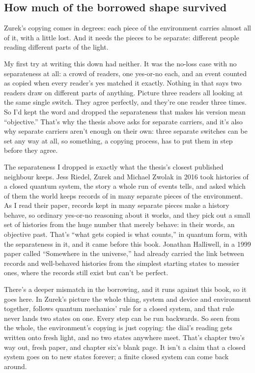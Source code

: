 \documentclass[11pt,twoside]{article}
\theoremstyle{thielethm}
\theoremstyle{thieledef}
\theoremstyle{thieledef}
\theoremstyle{thieledef}
\theoremstyle{thielethm}
\theoremstyle{thieleobs}
\theoremstyle{thielethm}
\begin{document}
\subsection{How much of the borrowed shape survived}

Zurek's copying comes in degrees: each piece of the environment carries almost all of it, with a little lost. And it needs the pieces to be separate: different people reading different parts of the light.

My first try at writing this down had neither. It was the no-loss case with no separateness at all: a crowd of readers, one yes-or-no each, and an event counted as copied when every reader's yes matched it exactly. Nothing in that says two readers draw on different parts of anything. Picture three readers all looking at the same single switch. They agree perfectly, and they're one reader three times. So I'd kept the word and dropped the separateness that makes his version mean ``objective.'' That's why the thesis above asks for separate carriers, and it's also why separate carriers aren't enough on their own: three separate switches can be set any way at all, so something, a copying process, has to put them in step before they agree.

The separateness I dropped is exactly what the thesis's closest published neighbour keeps. Jess Riedel, Zurek and Michael Zwolak in 2016 took histories of a closed quantum system, the story a whole run of events tells, and asked which of them the world keeps records of in many separate pieces of the environment. As I read their paper, records kept in many separate pieces make a history behave, so ordinary yes-or-no reasoning about it works, and they pick out a small set of histories from the huge number that merely behave: in their words, an objective past. That's ``what gets copied is what counts,'' in quantum form, with the separateness in it, and it came before this book. Jonathan Halliwell, in a 1999 paper called ``Somewhere in the universe,'' had already carried the link between records and well-behaved histories from the simplest starting states to messier ones, where the records still exist but can't be perfect.

There's a deeper mismatch in the borrowing, and it runs against this book, so it goes here. In Zurek's picture the whole thing, system and device and environment together, follows quantum mechanics' rule for a closed system, and that rule never lands two states on one. Every step can be run backwards. So seen from the whole, the environment's copying is just copying: the dial's reading gets written onto fresh light, and no two states anywhere meet. That's chapter two's way out, fresh paper, and chapter six's blank page. It isn't a claim that a closed system goes on to new states forever; a finite closed system can come back around.
\end{document}
